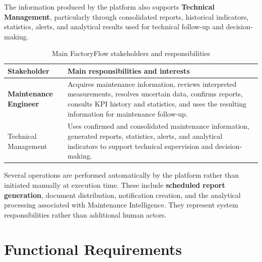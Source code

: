 The information produced by the platform also supports
\textbf{Technical Management}, particularly through consolidated reports,
historical indicators, statistics, alerts, and analytical results used for
technical follow-up and decision-making.

\begin{table}[H]
    \centering
    \caption{Main FactoryFlow stakeholders and responsibilities}
    \label{tab:factoryflow-stakeholders}

    \begin{tabularx}{\textwidth}{
        |>{\raggedright\arraybackslash\bfseries}p{}
        |>{\raggedright\arraybackslash}X|
    }
        \hline
        \textbf{Stakeholder}
        &
        \textbf{Main responsibilities and interests}
        \\
        \hline

        Maintenance Engineer
        &
        Acquires maintenance information, reviews interpreted measurements,
        resolves uncertain data, confirms reports, consults KPI history and
        statistics, and uses the resulting information for maintenance
        follow-up.
        \\
        \hline

        Technical Management
        &
        Uses confirmed and consolidated maintenance information, generated
        reports, statistics, alerts, and analytical indicators to support
        technical supervision and decision-making.
        \\
        \hline
    \end{tabularx}

\end{table}

Several operations are performed automatically by the platform rather than
initiated manually at execution time. These include
\textbf{scheduled report generation}, document distribution, notification
creation, and the analytical processing associated with Maintenance
Intelligence. They represent system responsibilities rather than additional
human actors.



\section{Functional Requirements}
\label{sec:functional-requirements}

